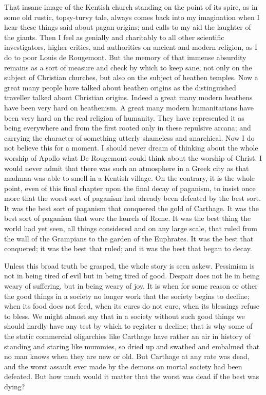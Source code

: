That insane image of the Kentish church standing on the point of its spire, as in some old rustic, topsy-turvy tale, always comes back into my imagination when I hear these things said about pagan origins; and calls to my aid the laughter of the giants. Then I feel as genially and charitably to all other scientific investigators, higher critics, and authorities on ancient and modern religion, as I do to poor Louis de Rougemont. But the memory of that immense absurdity remains as a sort of measure and check by which to keep sane, not only on the subject of Christian churches, but also on the subject of heathen temples. Now a great many people have talked about heathen origins as the distinguished traveller talked about Christian origins. Indeed a great many modern heathens have been very hard on heathenism. A great many modern humanitarians have been very hard on the real religion of humanity. They have represented it as being everywhere and from the first rooted only in these repulsive arcana; and carrying the character of something utterly shameless and anarchical. Now I do not believe this for a moment. I should never dream of thinking about the whole worship of Apollo what De Rougemont could think about the worship of Christ. I would never admit that there was such an atmosphere in a Greek city as that madman was able to smell in a Kentish village. On the contrary, it is the whole point, even of this final chapter upon the final decay of paganism, to insist once more that the worst sort of paganism had already been defeated by the best sort. It was the best sort of paganism that conquered the gold of Carthage. It was the best sort of paganism that wore the laurels of Rome. It was the best thing the world had yet seen, all things considered and on any large scale, that ruled from the wall of the Grampians to the garden of the Euphrates. It was the best that conquered; it was the best that ruled; and it was the best that began to decay.

Unless this broad truth be grasped, the whole story is seen askew. Pessimism is not in being tired of evil but in being tired of good. Despair does not lie in being weary of suffering, but in being weary of joy. It is when for some reason or other the good things in a society no longer work that the society begins to decline; when its food does not feed, when its cures do not cure, when its blessings refuse to bless. We might almost say that in a society without such good things we should hardly have any test by which to register a decline; that is why some of the static commercial oligarchies like Carthage have rather an air in history of standing and staring like mummies, so dried up and swathed and embalmed that no man knows when they are new or old. But Carthage at any rate was dead, and the worst assault ever made by the demons on mortal society had been defeated. But how much would it matter that the worst was dead if the best was dying?

